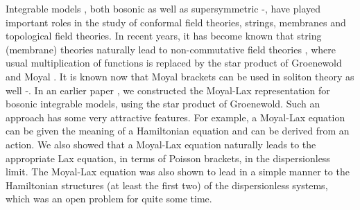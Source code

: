 \documentclass[a4paper,11pt]{article}
\begin{document}
Integrable models \cite{1}, both bosonic as well as supersymmetric
\cite{2}-\cite{6},  have played
important roles in the study of conformal field theories, strings,
membranes and topological field theories. In recent years, it has
become known that string (membrane) theories naturally lead to
non-commutative field theories \cite{7}, where usual multiplication of
functions is replaced by the star product of Groenewold \cite{8} and
Moyal \cite{9}. It is known now that Moyal brackets can be used in soliton
theory as well \cite{10}-\cite{12}. In an earlier paper \cite{13}, we
constructed the Moyal-Lax representation for bosonic integrable
models, using the star product of Groenewold. Such an approach has
some very attractive features. For example, a
Moyal-Lax equation can be given the meaning of a Hamiltonian equation
and can be derived from an action. We also showed that a Moyal-Lax
equation naturally leads to the appropriate Lax equation, in terms of
Poisson brackets, in the dispersionless limit. The Moyal-Lax equation
was also shown to lead in a simple manner to the Hamiltonian structures
(at least the first two) of the dispersionless systems, which 
was an open problem for quite some time.
\end{document}
